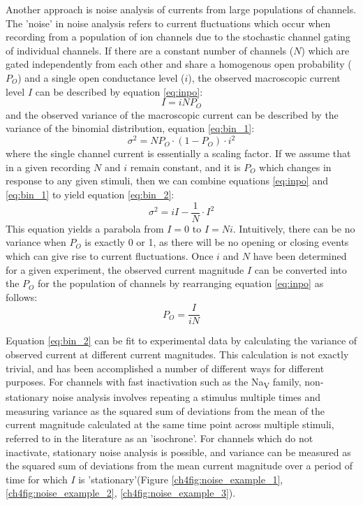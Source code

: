 Another approach is noise analysis of currents from large populations of channels.
The 'noise' in noise analysis refers to current fluctuations which occur when recording from a population of ion channels due to the stochastic channel gating of individual channels.
If there are a constant number of channels ($N$) which are gated independently from each other and share a homogenous open probability ($P_O$) and a single open conductance level ($i$), the observed macroscopic current level $I$ can be described by equation \ref{eq:inpo}:
\begin{equation}\label{eq:inpo}
	I = iNP_O
\end{equation}
and the observed variance of the macroscopic current can be described by the variance of the binomial distribution, equation \ref{eq:bin_1}:
\begin{equation}\label{eq:bin_1}
	\sigma^2 = NP_O \cdot (1 - P_O) \cdot i^2
\end{equation}
where the single channel current is essentially a scaling factor.
If we assume that in a given recording $N$ and $i$ remain constant, and it is $P_O$ which changes in response to any given stimuli, then we can combine equations \ref{eq:inpo} and \ref{eq:bin_1} to yield equation \ref{eq:bin_2}:
\begin{equation}\label{eq:bin_2}
	\sigma^2 = iI - \frac{1}{N} \cdot I^2
\end{equation}
This equation yields a parabola from $I = 0$ to $I = Ni$.
Intuitively, there can be no variance when $P_O$ is exactly 0 or 1, as there will be no opening or closing events which can give rise to current fluctuations.
Once $i$ and $N$ have been determined for a given experiment, the observed current magnitude $I$ can be converted into the $P_O$ for the population of channels by rearranging equation \ref{eq:inpo} as follows:
\begin{equation}\label{eq:poin}
	P_O = \frac{I}{iN}
\end{equation}

Equation \ref{eq:bin_2} can be fit to experimental data by calculating the variance of observed current at different current magnitudes.
This calculation is not exactly trivial, and has been accomplished a number of different ways for different purposes.
For channels with fast inactivation such as the Na\textsubscript{V} family, non-stationary noise analysis involves repeating a stimulus multiple times and measuring variance as the squared sum of deviations from the mean of the current magnitude calculated at the same time point across multiple stimuli, referred to in the literature as an 'isochrone'.
For channels which do not inactivate, stationary noise analysis is possible, and variance can be measured as the squared sum of deviations from the mean current magnitude over a period of time for which $I$ is 'stationary'(Figure \ref{ch4fig:noise_example_1}, \ref{ch4fig:noise_example_2}, \ref{ch4fig:noise_example_3}).

